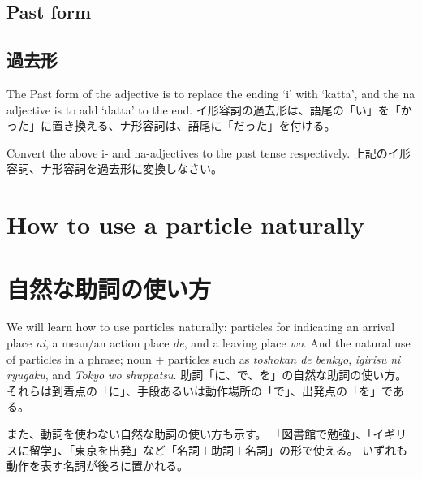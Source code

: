 \documentclass[uplatex,dvipdfmx,b5paper,english,10pt]{jsbook}
\begin{document}
\ifEnglish
\subsection{Past form}
\else
\subsection{過去形}
\fi

\ifEnglish
The Past form of the adjective is to replace the ending `i' with `katta', and the na adjective is to add `datta' to the end.
\else
イ形容詞の過去形は、語尾の「い」を「かった」に置き換える、ナ形容詞は、語尾に「だった」を付ける。
\fi

\begin{toiquestion}
\ifEnglish
Convert the above i- and na-adjectives to the past tense respectively.
\else
上記のイ形容詞、ナ形容詞を過去形に変換しなさい。
\fi
\end{toiquestion}

\ifEnglish
  \section{How to use a particle naturally}
\else
  \section{自然な助詞の使い方}
\fi

\ifEnglish
We will learn how to use particles naturally: particles for indicating an arrival place {\it ni\/}, a mean/an action place {\it de\/}, and a leaving place {\it wo\/}.
  And the natural use of particles in a phrase; noun + particles such as {\it toshokan de benkyo\/}, {\it igirisu ni ryugaku\/}, and {\it Tokyo wo shuppatsu\/}.
\else
  助詞「に、で、を」の自然な助詞の使い方。
  それらは到着点の「に」、手段あるいは動作場所の「で」、出発点の「を」である。

  また、動詞を使わない自然な助詞の使い方も示す。
  「図書館で勉強」、「イギリスに留学」、「東京を出発」など「名詞＋助詞＋名詞」の形で使える。
  いずれも動作を表す名詞が後ろに置かれる。
 \fi
\end{document}
